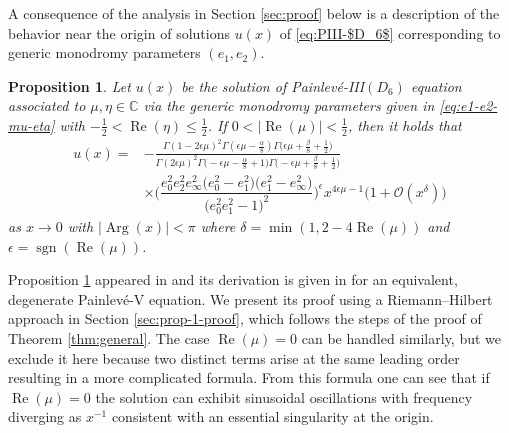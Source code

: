 \documentclass[11pt]{article}
\numberwithin{equation}{section}
\numberwithin{equation}{section}
\newtheorem{prop}[Theorem]{Proposition}
 { \theoremstyle{definition}
\newtheorem{Definition}[Theorem]{Definition}
\newtheorem{Note}[Theorem]{Note}
\newtheorem{Example}[Theorem]{Example}
\newtheorem{Remark}[Theorem]{Remark} }
\newcommand{\C}{{\mathbb{C}}}
\newcommand{\re}{\operatorname{Re}}
\renewcommand{\arg}{\operatorname{Arg}}
\newcommand{\sgn}{\operatorname{sgn}}
\begin{document}
A consequence of the analysis in Section \ref{sec:proof} below is a description of the behavior near the origin of solutions $u(x)$ of \eqref{eq:PIII-$D_6$} corresponding to generic monodromy parameters $(e_1, e_2)$.
\begin{prop}
\label{prop:un-zero-asymptotics}
 Let $u(x)$ be the solution of Painlev\'e-{\rm III}$(D_6)$ equation associated to $\mu, \eta \in \C$ via the generic monodromy parameters given in \eqref{eq:e1-e2-mu-eta} with $-\frac{1}{2}<\re(\eta)\leq\frac{1}{2}$. If $0<|{\re}(\mu)|<\frac{1}{2}$, then it holds that
 \begin{align}
 u(x) ={}& -\frac{ \Gamma (1 - 2\epsilon \mu)^2 \Gamma \left( \epsilon\mu -\frac{\alpha}{8}\right) \Gamma \big( \epsilon \mu+\frac{\beta}{8} + \frac{1}{2} \big)}{\Gamma (2 \epsilon \mu )^2 \Gamma \bigl(-\epsilon \mu-\frac{\alpha}{8}+1\bigr) \Gamma \bigl( - \epsilon \mu +\frac{\beta}{8} + \frac{1}{2} \bigr)} \nonumber\\
 &\times \Bigg(\dfrac{e_{0}^2 e_2^2 e_{\infty}^2\big(e_{0}^2-e_{1}^2\big) \big(e_{1}^2-e_{\infty}^2\big)}{\big(e_{0}^2 e_{1}^2-1\big)^2}\Bigg)^\epsilon
 x^{4 \epsilon \mu - 1} \big(1 + \mathcal{O}(x^\delta) \big)
 \label{eq:u-0-leading}
 \end{align}
 as $x\to 0$ with $|{\arg}(x)|<\pi$ where $\delta=\min(1,2-4\re(\mu))$ and $\epsilon = \sgn (\re (\mu))$.
\end{prop}
Proposition \ref{prop:un-zero-asymptotics} appeared in \cite[Theorem 3.2]{Jimbo} and its derivation is given in \cite{Kitaev87} for an equivalent, degenerate Painlev\'e-V equation. We present its proof using a Riemann--Hilbert approach in Section \ref{sec:prop-1-proof}, which follows the steps of the proof of Theorem \ref{thm:general}. The case $\re(\mu) = 0$ can be handled similarly, but we exclude it here because two distinct terms arise at the same leading order resulting in a more complicated formula. From this formula one can see that if $\re(\mu)=0$ the solution can exhibit sinusoidal oscillations with frequency diverging as $x^{-1}$ consistent with an essential singularity at the origin.
\end{document}
